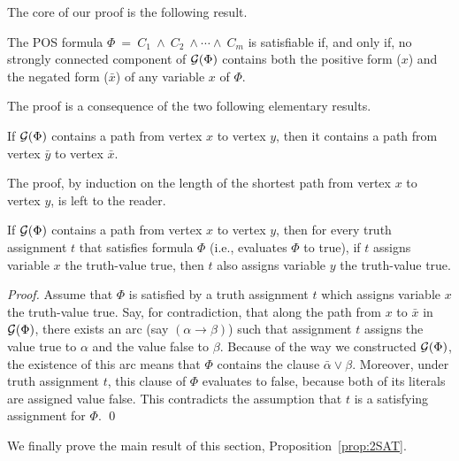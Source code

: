 The core of our proof is the following result.

\begin{prop}
\label{prop:2SAT}
The POS formula $\Phi \ = \ C_1 \ \wedge \ C_2 \ \wedge \cdots \wedge
\ C_m$ is satisfiable if, and only if, no strongly connected component
of $\mbox{$\cal G$}(\Phi)$ contains both the positive form ($x$) and the negated
form ($\bar{x}$) of any variable $x$ of $\Phi$.
\end{prop}

The proof is a consequence of the two following elementary results.

\begin{lemma}
\label{lem:2SATlemma1}
If $\mbox{$\cal G$}(\Phi)$ contains a path from vertex $x$ to vertex $y$, then it
contains a path from vertex $\bar{y}$ to vertex $\bar{x}$.
\end{lemma}

The proof, by induction on the length of the shortest path from vertex
$x$ to vertex $y$, is left to the reader. 

\begin{lemma}
\label{lem:2SATlemma2}
If $\mbox{$\cal G$}(\Phi)$ contains a path from vertex $x$ to vertex $y$, then for
every truth assignment $t$ that satisfies formula $\Phi$ (i.e.,
evaluates $\Phi$ to {\sc true}), if $t$ assigns variable $x$ the
truth-value {\sc true}, then $t$ also assigns variable $y$ the truth-value {\sc true}.
\end{lemma}

\begin{proof}
Assume that $\Phi$ is satisfied by a truth assignment $t$ which
assigns variable $x$ the truth-value {\sc true}.  Say, for
contradiction, that along the path from $x$ to $\bar{x}$ in
$\mbox{$\cal G$}(\Phi)$, there exists an arc (say $(\alpha \rightarrow\beta)$) such
that assignment $t$ assigns the value {\sc true} to $\alpha$ and the
value {\sc false} to $\beta$.  Because of the way we constructed
$\mbox{$\cal G$}(\Phi)$, the existence of this arc means that $\Phi$ contains the
clause $\bar{\alpha} \vee \beta$.  Moreover, under truth assignment
$t$, this clause of $\Phi$ evaluates to {\sc false}, because both of
its literals are assigned value {\sc false}.  This contradicts the
assumption that $t$ is a satisfying assignment for $\Phi$.  \qed
\end{proof}

We finally prove the main result of this section, Proposition~\ref{prop:2SAT}.


